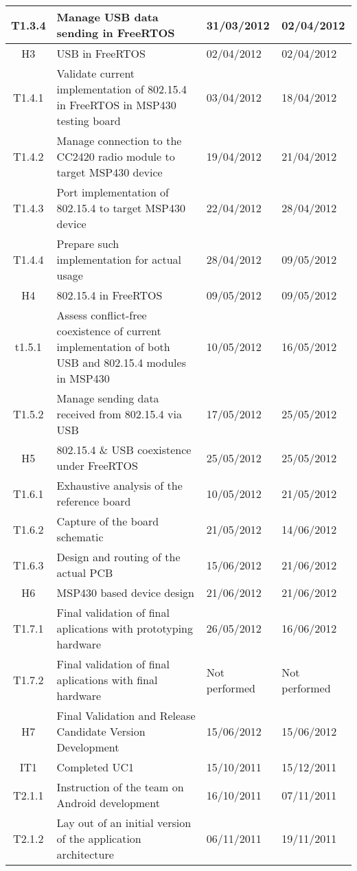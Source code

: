 \begin{tabular}{| c | p{6cm} | l | l |} %
\hline
T1.3.4 & Manage USB data sending in FreeRTOS & 31/03/2012 & 02/04/2012\\ \hline
H3 & USB in FreeRTOS & 02/04/2012 & 02/04/2012\\ \hline
T1.4.1 & Validate current implementation of 802.15.4 in FreeRTOS in MSP430 testing board & 03/04/2012 & 18/04/2012\\ \hline
T1.4.2 & Manage connection to the CC2420 radio module to target MSP430 device & 19/04/2012 & 21/04/2012\\ \hline
T1.4.3 & Port implementation of 802.15.4 to target MSP430 device & 22/04/2012 & 28/04/2012\\ \hline
T1.4.4 & Prepare such implementation for actual usage & 28/04/2012 & 09/05/2012\\ \hline
H4 & 802.15.4 in FreeRTOS & 09/05/2012 & 09/05/2012\\ \hline
t1.5.1 & Assess conflict-free coexistence of current implementation of both USB and 802.15.4 modules in MSP430 & 10/05/2012 & 16/05/2012\\ \hline
T1.5.2 & Manage sending data received from 802.15.4 via USB & 17/05/2012 & 25/05/2012\\ \hline
H5 & 802.15.4 \& USB coexistence under FreeRTOS & 25/05/2012 & 25/05/2012\\ \hline
T1.6.1 & Exhaustive analysis of the reference board & 10/05/2012 & 21/05/2012\\ \hline
T1.6.2 & Capture of the board schematic & 21/05/2012 & 14/06/2012\\ \hline
T1.6.3 & Design and routing of the actual PCB & 15/06/2012 & 21/06/2012\\ \hline
H6 & MSP430 based device design & 21/06/2012 & 21/06/2012\\ \hline
T1.7.1 & Final validation of final aplications with prototyping hardware & 26/05/2012 & 16/06/2012\\ \hline
T1.7.2 & Final validation of final aplications with final hardware & Not performed & Not performed\\ \hline
H7 & Final Validation and Release Candidate Version Development & 15/06/2012 & 15/06/2012\\ \hline
IT1 & Completed UC1 & 15/10/2011 & 15/12/2011\\ \hline
   T2.1.1 & Instruction of the team on Android development & 16/10/2011 & 07/11/2011\\ \hline
   T2.1.2 & Lay out of an initial version of the application architecture & 06/11/2011 & 19/11/2011\\ 
\hline
\end{tabular}\\\\

